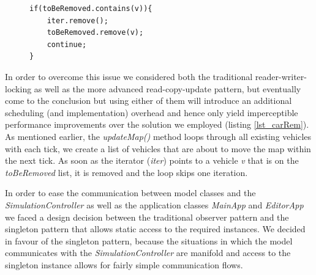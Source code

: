 \begin{figure}
	\begin{minipage}{0.45\textwidth}
		\begin{lstlisting}[caption={Car Removal}, label={lst_carRem}]
if(toBeRemoved.contains(v)){
	iter.remove();
	toBeRemoved.remove(v);
	continue;
}	
		\end{lstlisting}
	\end{minipage}
\end{figure}

In order to overcome this issue we considered both the traditional reader-writer-locking as well as the more advanced read-copy-update pattern, but eventually come to the conclusion but using either of them will introduce an additional scheduling (and implementation) overhead and hence only yield imperceptible performance improvements over the solution we employed (listing \ref{lst_carRem}). As mentioned earlier, the \textit{updateMap()} method loops through all existing vehicles with each tick, we create a list of vehicles that are about to move the map within the next tick. As soon as the iterator (\textit{iter}) points to a vehicle \textit{v} that is on the \textit{toBeRemoved} list, it is removed and the loop skips one iteration.  

In order to ease the communication between model classes and the \textit{SimulationController} as well as the application classes \textit{MainApp} and \textit{EditorApp} we faced a design decision between the traditional observer pattern and the singleton pattern that allows static access to the required instances. We decided in favour of the singleton pattern, because the situations in which the model communicates with the \textit{SimulationController} are manifold and access to the singleton instance allows for fairly simple communication flows.

